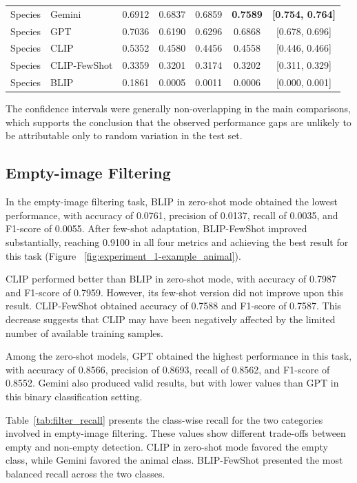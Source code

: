 \begin{table}[htbp]
\begin{tabular}{llccccc}
Species & Gemini & 0.6912 & 0.6837 & 0.6859 & \textbf{0.7589} & \textbf{[0.754, 0.764]} \\
Species & GPT & 0.7036 & 0.6190 & 0.6296 & 0.6868 & [0.678, 0.696] \\
Species & CLIP & 0.5352 & 0.4580 & 0.4456 & 0.4558 & [0.446, 0.466] \\
Species & CLIP-FewShot & 0.3359 & 0.3201 & 0.3174 & 0.3202 & [0.311, 0.329] \\
Species & BLIP & 0.1861 & 0.0005 & 0.0011 & 0.0006 & [0.000, 0.001] \\
\hline
\end{tabular}
\end{table}

The confidence intervals were generally non-overlapping in the main comparisons, which supports the conclusion that the observed performance gaps are unlikely to be attributable only to random variation in the test set.

\subsection{Empty-image Filtering}

In the empty-image filtering task, BLIP in zero-shot mode obtained the lowest performance, with accuracy of 0.0761, precision of 0.0137, recall of 0.0035, and F1-score of 0.0055. After few-shot adaptation, BLIP-FewShot improved substantially, reaching 0.9100 in all four metrics and achieving the best result for this task (Figure ~\ref{fig:experiment_1-example_animal}).

CLIP performed better than BLIP in zero-shot mode, with accuracy of 0.7987 and F1-score of 0.7959. However, its few-shot version did not improve upon this result. CLIP-FewShot obtained accuracy of 0.7588 and F1-score of 0.7587. This decrease suggests that CLIP may have been negatively affected by the limited number of available training samples.

Among the zero-shot models, GPT obtained the highest performance in this task, with accuracy of 0.8566, precision of 0.8693, recall of 0.8562, and F1-score of 0.8552. Gemini also produced valid results, but with lower values than GPT in this binary classification setting.

Table~\ref{tab:filter_recall} presents the class-wise recall for the two categories involved in empty-image filtering. These values show different trade-offs between empty and non-empty detection. CLIP in zero-shot mode favored the empty class, while Gemini favored the animal class. BLIP-FewShot presented the most balanced recall across the two classes.

